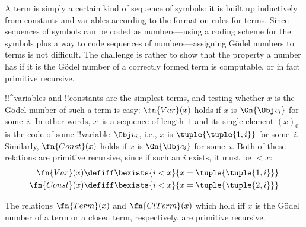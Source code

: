 \documentclass[../../../include/open-logic-section]{subfiles}
\begin{document}

\begin{explain}
A term is simply a certain kind of sequence of symbols: it is built up
inductively from constants and variables according to the formation
rules for terms.  Since sequences of symbols can be coded as
numbers---using a coding scheme for the symbols plus a way to code
sequences of numbers---assigning G\"odel numbers to terms is not
difficult.  The challenge is rather to show that the property a number
has if it is the G\"odel number of a correctly formed term is
computable, or in fact primitive recursive.
\end{explain}

!!^{variable}s and !!{constant}s are the simplest terms, and testing
whether $x$ is the G\"odel number of such a term is easy:
$\fn{Var}(x)$ holds if $x$ is $\Gn{\Obj v_i}$ for some~$i$. In other words,
$x$~is a sequence of length~$1$ and its single element $(x)_0$ is the
code of some !!{variable}~$\Obj v_i$, i.e., $x$ is $\tuple{\tuple{1, i}}$ for
some~$i$. Similarly, $\fn{Const}(x)$ holds if $x$ is $\Gn{\Obj c_i}$ for
some~$i$. Both of these relations are primitive recursive, since if
such an $i$ exists, it must be $< x$:
\begin{align*}
  \fn{Var}(x) & \defiff \bexists{i<x}{x = \tuple{\tuple{1, i}}}\\
  \fn{Const}(x) & \defiff \bexists{i<x}{x = \tuple{\tuple{2, i}}}
\end{align*}

\begin{prop}
The relations $\fn{Term}(x)$ and $\fn{ClTerm}(x)$ which hold iff $x$
is the G\"odel number of a term or a closed term, respectively, are
primitive recursive.
\end{prop}
\end{document}
